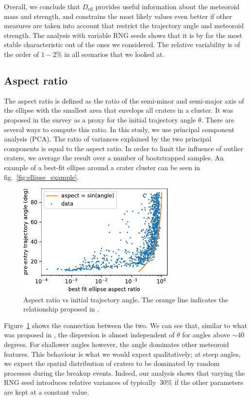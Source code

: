 Overall, we conclude that $D_\mathrm{eff}$ provides useful information about the meteoroid mass and strength, and constrains the most likely values even better if other measures are taken into account that restrict the trajectory angle and meteoroid strength. The analysis with variable RNG seeds shows that it is by far the most stable characteristic out of the ones we considered. The relative variability is of the order of $1 - 2\%$ in all scenarios that we looked at.

\subsection{Aspect ratio}
The aspect ratio is defined as the ratio of the semi-minor and semi-major axis of the ellipse with the smallest area that envelops all craters in a cluster.
It was proposed in the \cite{daubar2019recently} survey as a proxy for the initial trajectory angle $\theta$. 
There are several ways to compute this ratio. In this study, we use principal component analysis (PCA).
The ratio of variances explained by the two principal components is equal to the aspect ratio. In order to limit the influence of outlier craters, we average the result over a number of bootstrapped samples. An example of a best-fit ellipse around a crater cluster can be seen in fig.~\ref{fig:ellipse_example}.

\begin{figure}
    \centering
    \includegraphics[width=0.7\textwidth]{figures/aspect_vs_angle}
    \caption{Aspect ratio vs initial trajectory angle. The orange line indicates the relationship proposed in \cite{daubar2019recently}.}
    \label{fig:aspect_vs_angle}
\end{figure}

Figure~\ref{fig:aspect_vs_angle} shows the connection between the two. We can see that, similar to what was proposed in \cite{daubar2019recently}, the dispersion is almost independent of $\theta$ for angles above $\sim$40 degrees.
For shallower angles however, the angle dominates other meteoroid features. This behaviour is what we would expect qualitatively; at steep angles, we expect the spatial distribution of craters to be dominated by random processes during the breakup events.
Indeed, our analysis shows that varying the RNG seed introduces relative variances of typically $~30\%$ if the other parameters are kept at a constant value.

